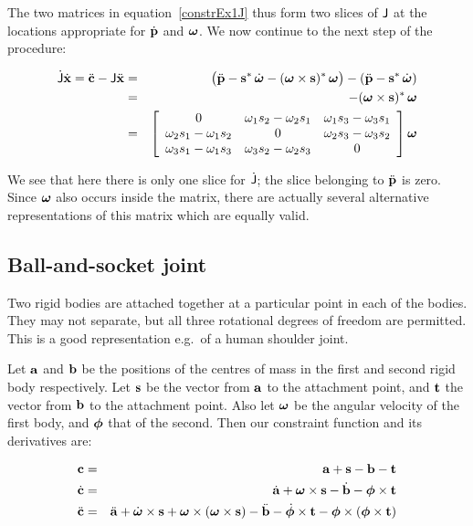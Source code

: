 The two matrices in equation~\ref{constrEx1J} thus form two slices of $\mathsf{J}$ at
the locations appropriate for $\dot{\ve{p}}$ and $\ve{\omega}$. We now continue to the
next step of the procedure:

\begin{eqnarray}
\dot{\m{J}}\dot{\ve{x}} = 
\ddot{\ve{c}} - \m{J}\ddot{\ve{x}} &=&
    \big(\ddot{\ve{p}} - \dual{\ve{s}}\,\dot{\ve{\omega}} -
    \dual{(\ve{\omega}\times\ve{s})}\,\ve{\omega}\big) -
    (\ddot{\ve{p}} - \dual{\ve{s}}\,\dot{\ve{\omega}}) \nonumber\\
& = & -\dual{(\ve{\omega}\times\ve{s})}\,\ve{\omega} \nonumber\\
& = & \left[\begin{array}{ccc} 0 &
    \omega_1 s_2 - \omega_2 s_1 &
    \omega_1 s_3 - \omega_3 s_1 \\
    \omega_2 s_1 - \omega_1 s_2 & 0 &
    \omega_2 s_3 - \omega_3 s_2 \\
    \omega_3 s_1 - \omega_1 s_3 &
    \omega_3 s_2 - \omega_2 s_3 & 0
    \end{array}\right] \ve{\omega} \nonumber\\\label{constrEx1JDot}
\end{eqnarray}

We see that here there is only one slice for $\dot{\mathsf{J}}$; the slice belonging to $\ddot{\ve{p}}$
is zero. Since $\ve{\omega}$ also occurs inside the matrix, there are actually several
alternative representations of this matrix which are equally valid.

\subsection{Ball-and-socket joint\label{constrJoint}}

Two rigid bodies are attached together at a particular point in each of the bodies.
They may not separate, but all three rotational degrees of freedom are permitted. This is
a good representation e.g.\ of a human shoulder joint.

Let $\ve{a}$ and $\ve{b}$ be the positions of the centres of mass in the first and
second rigid body respectively. Let $\ve{s}$ be the vector from $\ve{a}$ to the 
attachment point, and $\ve{t}$ the vector from $\ve{b}$ to the attachment point.
Also let $\ve{\omega}$ be the angular velocity of the first body, and $\ve{\phi}$ that
of the second. Then our constraint function and its derivatives are:

\begin{eqnarray}
\ve{c} &=& \ve{a} + \ve{s} - \ve{b} - \ve{t} \\
\dot{\ve{c}} &=& \dot{\ve{a}} + \ve{\omega}\times\ve{s} -
    \dot{\ve{b}} - \ve{\phi}\times\ve{t} \\
\ddot{\ve{c}} &=& \ddot{\ve{a}} + \dot{\ve{\omega}}\times\ve{s} +
    \ve{\omega}\times(\ve{\omega}\times\ve{s}) -
    \ddot{\ve{b}} - \dot{\ve{\phi}}\times\ve{t} -
    \ve{\phi}\times(\ve{\phi}\times\ve{t})
\end{eqnarray}

